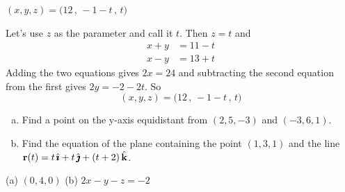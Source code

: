 %

\begin{answer}
$(x,y,z) = \big(12\,,\,-1-t\,,\,t\big)$
\end{answer}

\begin{solution}
Let's use $z$ as the parameter and call it $t$. Then $z=t$
and
\begin{align*}
x+y&=11-t \\
x-y&=13+t
\end{align*}
Adding the two equations gives $2x=24$ and subtracting the
second equation from the first gives $2y=-2-2t$. So
\begin{equation*}
(x,y,z) = \big(12\,,\,-1-t\,,\,t\big)
\end{equation*}
\end{solution}

\begin{question}[M200 2000A] %
\begin{enumerate}[(a)]
\item
Find a point on the y-axis equidistant from 
                $(2, 5, -3)$ and $(-3, 6, 1)$. 

\item  
Find the equation of the plane containing the point 
           $(1, 3, 1)$ and the line $\mathbf{r}(t) = t\,\hat{\pmb{\imath}} + t\,\hat{\pmb{\jmath}} + (t + 2)\,\hat{\mathbf{k}}$.
\end{enumerate}
\end{question}

%

\begin{answer}
(a) $(0,4,0)$\qquad
(b) $2x-y-z=-2$
\end{answer}

